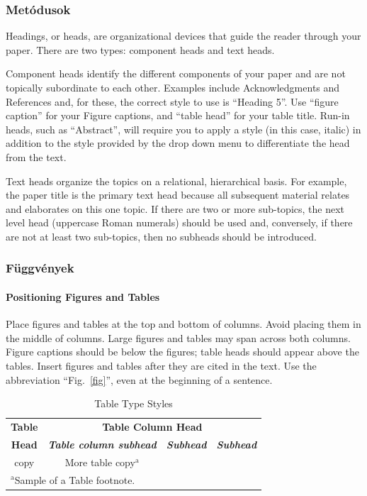\documentclass[conference]{IEEEtran}
\begin{document}
\subsubsection{Metódusok}
Headings, or heads, are organizational devices that guide the reader through 
your paper. There are two types: component heads and text heads.

Component heads identify the different components of your paper and are not 
topically subordinate to each other. Examples include Acknowledgments and 
References and, for these, the correct style to use is ``Heading 5''. Use 
``figure caption'' for your Figure captions, and ``table head'' for your 
table title. Run-in heads, such as ``Abstract'', will require you to apply a 
style (in this case, italic) in addition to the style provided by the drop 
down menu to differentiate the head from the text.

Text heads organize the topics on a relational, hierarchical basis. For 
example, the paper title is the primary text head because all subsequent 
material relates and elaborates on this one topic. If there are two or more 
sub-topics, the next level head (uppercase Roman numerals) should be used 
and, conversely, if there are not at least two sub-topics, then no subheads 
should be introduced.

\subsubsection{Függvények}
\paragraph{Positioning Figures and Tables} Place figures and tables at the top and 
bottom of columns. Avoid placing them in the middle of columns. Large 
figures and tables may span across both columns. Figure captions should be 
below the figures; table heads should appear above the tables. Insert 
figures and tables after they are cited in the text. Use the abbreviation 
``Fig.~\ref{fig}'', even at the beginning of a sentence.

\begin{table}[htbp]
\caption{Table Type Styles}
\begin{center}
\begin{tabular}{|c|c|c|c|}
\hline
\textbf{Table}&\multicolumn{3}{|c|}{\textbf{Table Column Head}} \\
\cline{2-4} 
\textbf{Head} & \textbf{\textit{Table column subhead}}& \textbf{\textit{Subhead}}& \textbf{\textit{Subhead}} \\
\hline
copy& More table copy$^{\mathrm{a}}$& &  \\
\hline
\multicolumn{4}{l}{$^{\mathrm{a}}$Sample of a Table footnote.}
\end{tabular}
\label{tab1}
\end{center}
\end{table}
\end{document}
